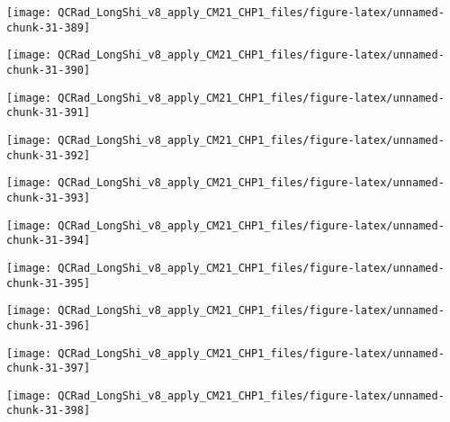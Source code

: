 \documentclass[
  10pt,
  a4paper,oneside]{article}
\begin{document}
\begin{center}\texttt{[image: QCRad\_LongShi\_v8\_apply\_CM21\_CHP1\_files/figure-latex/unnamed-chunk-31-389]} \end{center}

\begin{center}\texttt{[image: QCRad\_LongShi\_v8\_apply\_CM21\_CHP1\_files/figure-latex/unnamed-chunk-31-390]} \end{center}

\begin{center}\texttt{[image: QCRad\_LongShi\_v8\_apply\_CM21\_CHP1\_files/figure-latex/unnamed-chunk-31-391]} \end{center}

\begin{center}\texttt{[image: QCRad\_LongShi\_v8\_apply\_CM21\_CHP1\_files/figure-latex/unnamed-chunk-31-392]} \end{center}

\begin{center}\texttt{[image: QCRad\_LongShi\_v8\_apply\_CM21\_CHP1\_files/figure-latex/unnamed-chunk-31-393]} \end{center}

\begin{center}\texttt{[image: QCRad\_LongShi\_v8\_apply\_CM21\_CHP1\_files/figure-latex/unnamed-chunk-31-394]} \end{center}

\begin{center}\texttt{[image: QCRad\_LongShi\_v8\_apply\_CM21\_CHP1\_files/figure-latex/unnamed-chunk-31-395]} \end{center}

\begin{center}\texttt{[image: QCRad\_LongShi\_v8\_apply\_CM21\_CHP1\_files/figure-latex/unnamed-chunk-31-396]} \end{center}

\begin{center}\texttt{[image: QCRad\_LongShi\_v8\_apply\_CM21\_CHP1\_files/figure-latex/unnamed-chunk-31-397]} \end{center}

\begin{center}\texttt{[image: QCRad\_LongShi\_v8\_apply\_CM21\_CHP1\_files/figure-latex/unnamed-chunk-31-398]} \end{center}
\end{document}
